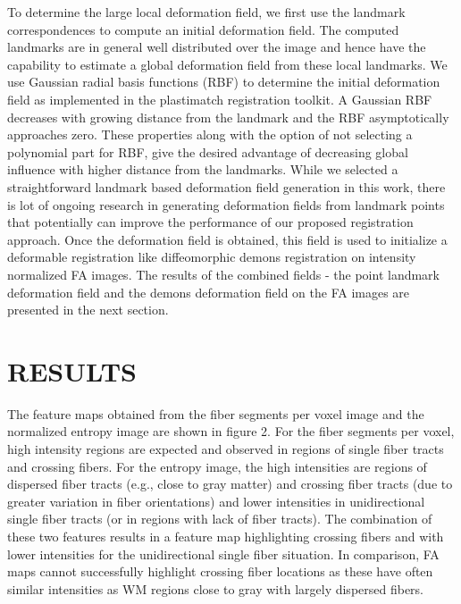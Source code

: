 \documentclass[]{spie}  %
\begin{document}
To determine the large local deformation field, we first use the landmark correspondences to compute an initial deformation field. The computed landmarks are in general well distributed over the image and hence have the capability to estimate a global deformation field from these  local landmarks. We use  Gaussian radial basis functions (RBF) to determine the initial deformation field as implemented in the plastimatch registration toolkit. A Gaussian RBF decreases with growing distance from the landmark and the RBF asymptotically approaches zero. These properties along with the option of not selecting a polynomial part for RBF, give the desired advantage of decreasing global influence with higher distance from the landmarks. While we selected a straightforward landmark based deformation field generation in this work, there is lot of ongoing research in generating deformation fields from landmark points that potentially can improve the performance of our proposed registration approach. Once the deformation field is obtained, this field is used to initialize a deformable registration like diffeomorphic demons registration on intensity normalized FA images. The results of the combined fields - the point landmark deformation field and the demons deformation field on the FA images are presented in the next section.

\section{RESULTS}
The feature maps obtained from the fiber segments per voxel image and the normalized entropy image are shown in figure 2. For the fiber segments per voxel,  high intensity regions are expected and observed in regions of single fiber tracts and crossing fibers. For the entropy image, the high intensities are regions of dispersed fiber tracts (e.g., close to gray matter) and crossing fiber tracts (due to greater variation in fiber orientations) and lower intensities in unidirectional single fiber tracts (or in regions with lack of fiber tracts). The combination of  these two features results in a feature map highlighting crossing fibers and with lower intensities for the unidirectional single fiber situation. In comparison, FA maps cannot successfully highlight crossing fiber locations as these have often similar intensities as WM regions close to gray with largely dispersed fibers.
\end{document}

